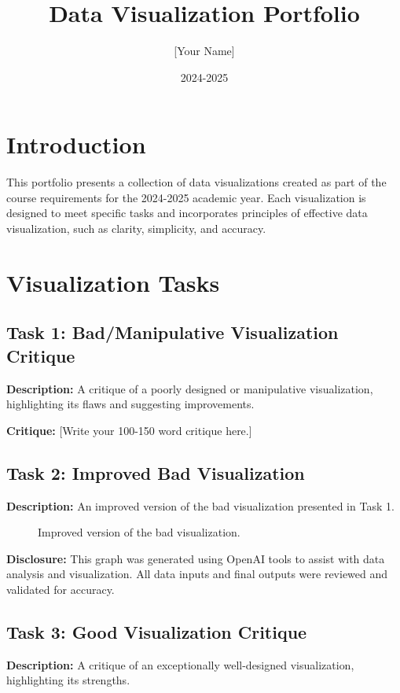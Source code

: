 \documentclass[a4paper,landscape]{article}
\title{Data Visualization Portfolio}
\author{[Your Name]}
\date{2024-2025}
\begin{document}
\maketitle

\tableofcontents
\newpage

\section{Introduction}
This portfolio presents a collection of data visualizations created as part of the course requirements for the 2024-2025 academic year. Each visualization is designed to meet specific tasks and incorporates principles of effective data visualization, such as clarity, simplicity, and accuracy.

\section{Visualization Tasks}

\subsection{Task 1: Bad/Manipulative Visualization Critique}
\textbf{Description:} A critique of a poorly designed or manipulative visualization, highlighting its flaws and suggesting improvements.

\textbf{Critique:}
[Write your 100-150 word critique here.]

\subsection{Task 2: Improved Bad Visualization}
\textbf{Description:} An improved version of the bad visualization presented in Task 1.

\begin{figure}[H]
    \centering
    \caption{Improved version of the bad visualization.}
    \label{fig:improved}
\end{figure}

\textbf{Disclosure:} This graph was generated using OpenAI tools to assist with data analysis and visualization. All data inputs and final outputs were reviewed and validated for accuracy.

\subsection{Task 3: Good Visualization Critique}
\textbf{Description:} A critique of an exceptionally well-designed visualization, highlighting its strengths.
\end{document}
